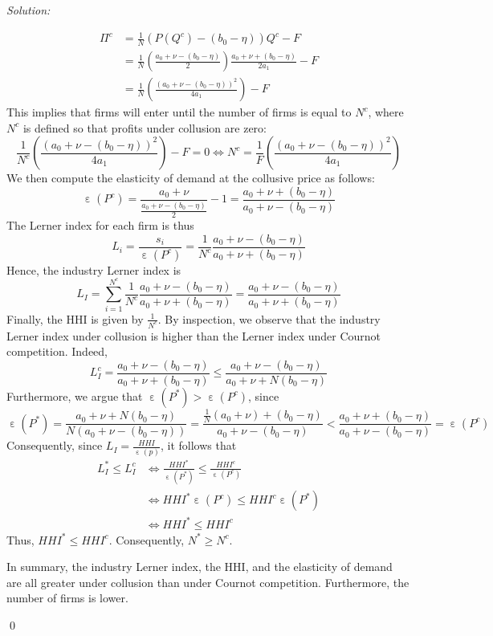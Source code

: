 \documentclass[12pt]{article}
\DeclareMathOperator{\eps}{\varepsilon}
\newenvironment{sol}
    {\emph{Solution:}
    }
    {
    \qed
    }
\begin{document}
\begin{sol}
\begin{enumerate}[label=\alph*) ]
     \begin{align*}\Pi^c &= \frac{1}{N} \left( P(Q^c) - (b_0 - \eta)\right)Q^c - F\\
        &= \frac{1}{N} \left(\frac{a_0 + \nu - (b_0 - \eta)}{2} \right)\frac{a_0 + \nu + (b_0 - \eta)}{2 a_1} - F\\
        &= \frac{1}{N}\left( \frac{(a_0 + \nu - (b_0 - \eta))^2}{4 a_1}\right) - F
    \end{align*}
    This implies that firms will enter until the number of firms is equal to $N^c$, where $N^c$ is defined so that profits under collusion are zero:
\[\frac{1}{N^c}\left( \frac{(a_0 + \nu - (b_0 - \eta))^2}{4 a_1}\right) - F = 0 \iff N^c = \frac{1}{F}\left( \frac{(a_0 + \nu - (b_0 - \eta))^2}{4 a_1}\right)\]
We then compute the elasticity of demand at the collusive price as follows:
\[\eps(P^c) = \frac{a_0 + \nu}{\frac{a_0 + \nu - (b_0 - \eta)}{2}} - 1 = \frac{a_0 + \nu + (b_0 - \eta)}{a_0 + \nu - (b_0 - \eta)}\]
The Lerner index for each firm is thus
\[L_i = \frac{s_i}{\eps(P^c)} = \frac{1}{N^c} \frac{a_0 + \nu - (b_0 - \eta)}{a_0 + \nu + (b_0 - \eta)}\]
Hence, the industry Lerner index is
\[L_I = \sum_{i=1}^{N^c} \frac{1}{N^c }\frac{a_0 + \nu - (b_0 - \eta)}{a_0 + \nu + (b_0 - \eta)} = \frac{a_0 + \nu - (b_0 - \eta)}{a_0 + \nu + (b_0 - \eta)} \]
Finally, the HHI is given by $\frac{1}{N^c}$. By inspection, we observe that the industry Lerner index under collusion is higher than the Lerner index under Cournot competition. Indeed,
\[L_I^c = \frac{a_0 + \nu - (b_0 - \eta)}{a_0 + \nu + (b_0 - \eta)} \leq \frac{a_0 + \nu - (b_0 - \eta)}{a_0 + \nu + N(b_0 - \eta)}\]
Furthermore, we argue that $\eps(P^*) > \eps(P^c)$, since
\[\eps(P^*) = \frac{a_0 + \nu + N(b_0 - \eta)}{N(a_0 + \nu - (b_0 - \eta))} =\frac{\frac{1}{N}(a_0 + \nu) + (b_0 - \eta)}{a_0 + \nu - (b_0 - \eta)} < \frac{a_0 + \nu + (b_0 - \eta)}{a_0 + \nu - (b_0 - \eta)} = \eps(P^c) \]
Consequently, since $L_I = \frac{HHI}{\eps(p)}$, it follows that
\begin{align*}L_I^* \leq L_I^c &\iff \frac{HHI^*}{\eps(P^*)} \leq \frac{HHI^c}{\eps(P^c)} \\
&\iff HHI^* \eps(P^c) \leq HHI^c \eps(P^*)\\
&\iff HHI^* \leq HHI^c
\end{align*}
Thus, $HHI^* \leq HHI^c$. Consequently, $N^* \geq N^c$.

In summary, the industry Lerner index, the HHI, and the elasticity of demand are all greater under collusion than under Cournot competition. Furthermore, the number of firms is lower.
\end{enumerate}
\end{sol}
\end{document}
